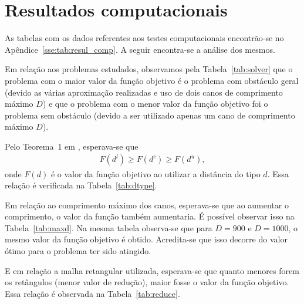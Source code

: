 \section{Resultados computacionais}
As tabelas com os dados referentes aos testes computacionais encontrão-se no
Apêndice~\ref{sse:tab:resul_comp}. A seguir encontra-se a análise dos mesmos.

Em relação aos problemas estudados, observamos pela Tabela~\ref{tab:solver} que
o problema com o maior valor da função objetivo é o problema com obstáculo geral
(devido as várias aproximação realizadas e uso de dois canos de comprimento
máximo $D$) e que o problema com o menor valor da função objetivo foi o problema
sem obstáculo (devido a ser utilizado apenas um cano de comprimento máximo $D$).

Pelo Teorema~1 em \cite{Andjel:1989:TP}, esperava-se que 
\begin{align*}
    F(d^l) \geq F(d^c) \geq F(d^u),
\end{align*}
onde $F(d)$ é o valor da função objetivo ao utilizar a distância do tipo $d$.
Essa relação é verificada na Tabela~\ref{tab:dtype}.

Em relação ao comprimento máximo dos canos, esperava-se que ao aumentar o
comprimento, o valor da função também aumentaria. É possível observar isso na
Tabela~\ref{tab:maxd}. Na mesma tabela observa-se que para $D = 900$ e $D =
1000$, o mesmo valor da função objetivo é obtido. Acredita-se que isso decorre
do valor ótimo para o problema ter sido atingido.

E em relação a malha retangular utilizada, esperava-se que quanto menores forem
os retângulos (menor valor de redução), maior fosse o valor da função objetivo.
Essa relação é observada na Tabela~\ref{tab:reduce}.
